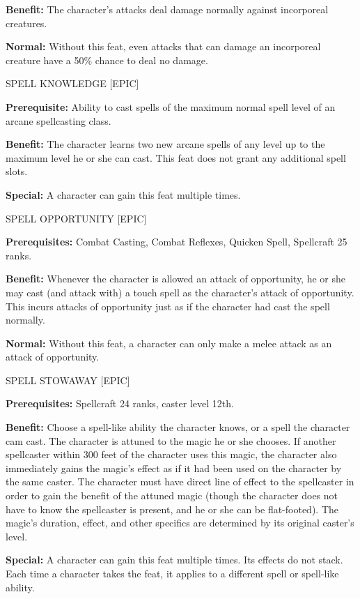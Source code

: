\documentclass{article}
\begin{document}
\textbf{Benefit:} The character's attacks deal damage normally against incorporeal 
creatures. 

\textbf{Normal:} Without this feat, even attacks that can damage an incorporeal 
creature have a 50\% chance to deal no damage.

\vspace{12pt}
SPELL KNOWLEDGE [EPIC] 

\textbf{Prerequisite:} Ability to cast spells of the maximum normal spell level 
of an arcane spellcasting class. 

\textbf{Benefit:} The character learns two new arcane spells of any level up to 
the maximum level he or she can cast. This feat does not grant any additional spell 
slots. 

\textbf{Special:} A character can gain this feat multiple times. 

\vspace{12pt}
SPELL OPPORTUNITY [EPIC] 

\textbf{Prerequisites:} Combat Casting, Combat Reflexes, Quicken Spell, Spellcraft 
25 ranks. 

\textbf{Benefit:} Whenever the character is allowed an attack of opportunity, he 
or she may cast (and attack with) a touch spell as the character's attack of opportunity. 
This incurs attacks of opportunity just as if the character had cast the spell 
normally. 

\textbf{Normal:} Without this feat, a character can only make a melee attack as 
an attack of opportunity. 

\vspace{12pt}
SPELL STOWAWAY [EPIC] 

\textbf{Prerequisites:} Spellcraft 24 ranks, caster level 12th. 

\textbf{Benefit:} Choose a spell-like ability the character knows, or a spell the 
character cam cast.  The character is attuned to the magic he or she chooses. If 
another spellcaster within 300 feet of the character uses this magic, the character 
also immediately gains the magic's effect as if it had been used on the character 
by the same caster. The character must have direct line of effect to the spellcaster 
in order to gain the benefit of the attuned magic (though the character does not 
have to know the spellcaster is present, and he or she can be flat-footed). The 
magic's duration, effect, and other specifics are determined by its original caster's 
level. 

\textbf{Special:} A character can gain this feat multiple times. Its effects do 
not stack. Each time a character takes the feat, it applies to a different spell 
or spell-like ability. 
\end{document}
